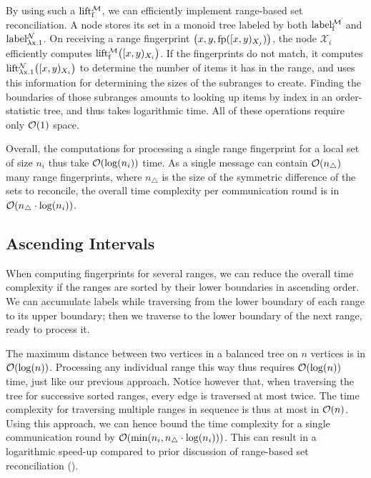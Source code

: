 \documentclass[conference]{IEEEtran}
\newcommand{\peer}[1]{\ensuremath{\mathcal{X}_{#1}}}
\begin{document}
By using such a \somewhatmorphism{} $\operatorname{lift_{\operatorname{f}}^{\mathcal{M}}}$, we can efficiently implement range-based set reconciliation. A node stores its set in a monoid tree labeled by both $\operatorname{label_{\operatorname{f}}^{\mathcal{M}}}$ and $\operatorname{label_{\lambda x.1}^{\mathcal{N}}}$. On receiving a range fingerprint $\bigl({x}, {y}, {\operatorname{fp}([{x},{y})_{X_j})}\bigr)$, the node \peer{i} efficiently computes $\operatorname{lift_{\operatorname{f}}^{\mathcal{M}}}\bigl([{x},{y})_{X_i}\bigr)$. If the fingerprints do not match, it computes $\operatorname{lift_{\lambda x.1}^{\mathcal{N}}}\bigl([{x},{y})_{X_i}\bigr)$ to determine the number of items it has in the range, and uses this information for determining the sizes of the subranges to create. Finding the boundaries of those subranges amounts to looking up items by index in an order-statistic tree, and thus takes logarithmic time. All of these operations require only $\mathcal{O}(1)$ space.

Overall, the computations for processing a single range fingerprint for a local set of size $n_i$ thus take $\mathcal{O}(\log(n_i))$ time. As a single message can contain $\mathcal{O}(n_{\triangle})$ many range fingerprints, where $n_{\triangle}$ is the size of the symmetric difference of the sets to reconcile, the overall time complexity per communication round is in $\mathcal{O}(n_{\triangle} \cdot \log(n_i))$.

\subsection{Ascending Intervals}

When computing fingerprints for several ranges, we can reduce the overall time complexity if the ranges are sorted by their lower boundaries in ascending order. We can accumulate labels while traversing from the lower boundary of each range to its upper boundary; then we traverse to the lower boundary of the next range, ready to process it.

The maximum distance between two vertices in a balanced tree on $n$ vertices is in $\mathcal{O}(\log(n))$. Processing any individual range this way thus requires $\mathcal{O}(\log(n))$ time, just like our previous approach. Notice however that, when traversing the tree for successive sorted ranges, every edge is traversed at most twice. The time complexity for traversing multiple ranges in sequence is thus at most in $\mathcal{O}(n)$. Using this approach, we can hence bound the time complexity for a single communication round by $\mathcal{O}(\min(n_i, n_{\triangle} \cdot \log(n_i)))$. This can result in a logarithmic speed-up compared to prior discussion of range-based set reconciliation (\cite{chen1999prototype}\cite{shang2017survey}).
\end{document}
